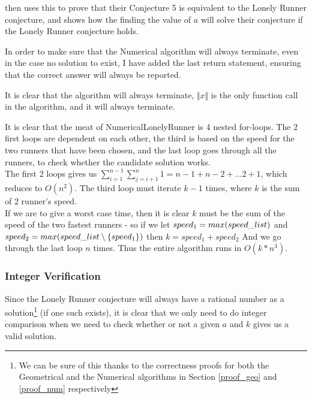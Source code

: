\cite{invis} then uses this to prove that their Conjecture 5 is equivalent to the Lonely Runner conjecture, and shows how the finding the value of $a$ will solve their conjecture if the Lonely Runner conjecture holds.

In order to make sure that the Numerical algorithm will always terminate, even in the case no solution to  exist, I have added the last return statement, ensuring that the correct answer will always be reported.

\begin{theo}[Termination:]
It is clear that the algorithm will always terminate, $\Vert x \Vert $ is the only function call in the algorithm, and it will always terminate.
\end{theo}

\begin{theo}
It is clear that the meat of NumericalLonelyRunner is 4 nested for-loops. The 2 first loops are dependent on each other, the third is based on the speed for the two runners that have been chosen, and the last loop goes through all the runners, to check whether the candidate solution works.\\

The first 2 loops gives us $\sum_{i=1}^{n-1}\sum_{j=i+1}^{n}1 = n-1 + n-2 + \ldots 2 + 1$, which reduces to $O(n^2)$. The third loop must iterate $k-1$ times, where $k$ is the sum of 2 runner's speed.\\

If we are to give a worst case time, then it is clear $k$ must be the sum of the speed of the two fastest runners - so if we let $speed_1 = max(speed\_list)$ and $speed_2 = max(speed\_list \setminus \{speed_1\})$ then $k = speed_1 + speed_2$
And we go through the last loop $n$ times. Thus the entire algorithm runs in $O(k * n^3)$.
\end{theo}

\subsubsection{Integer Verification}
Since the Lonely Runner conjecture will always have a rational number as a solution\footnote{We can be sure of this thanks to the correctness proofs for both the Geometrical and the Numerical algorithms in Section \ref{proof_geo} and \ref{proof_num} respectively} (if one such exists), it is clear that we only need to do integer comparison when we need to check whether or not a given $a$ and $k$ gives us a valid solution.

